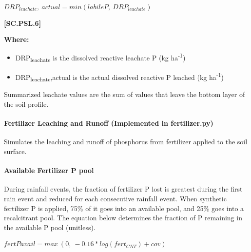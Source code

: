     \begin{center}
\(DRP_{leachate},\ actual=min(labileP,\ DRP_{leachate}) \)

    \end{center}
        \vspace{0.5cm} 
    
            {\raggedleft \textbf{[SC.PSL.6]}\par}
            \vspace{0.5cm}

        \textbf{Where:}
            
        \begin{itemize}
            \item DRP\textsubscript{leachate} is the dissolved reactive leachate P (kg ha\textsuperscript{-1})
            \item DRP\textsubscript{leachate},actual is the actual dissolved reactive P leached (kg ha\textsuperscript{-1})
        \end{itemize}
        \vspace{0.2cm}

Summarized leachate values are the sum of values that leave the bottom layer of the soil profile.	
\paragraph{Fertilizer Leaching and Runoff (Implemented in fertilizer.py)}
Simulates the leaching and runoff of phosphorus from fertilizer applied to the soil surface.
\vspace{0.2cm}

\paragraph{Available Fertilizer P pool }
\vspace{0.2cm}

During rainfall events, the fraction of fertilizer P lost is greatest during the first rain event and reduced for each consecutive rainfall event. When synthetic fertilizer P is applied, 75\% of it goes into an available pool, and 25\% goes into a recalcitrant pool. The equation below determines the fraction of P remaining in the available P pool (unitless). 
        \vspace{0.5cm}
        
    \begin{center}
\(fertPavail= max\ (0,\ -0.16 * log(fert_{CNT})+cov)\)

    \end{center}
        \vspace{0.5cm} 
    

